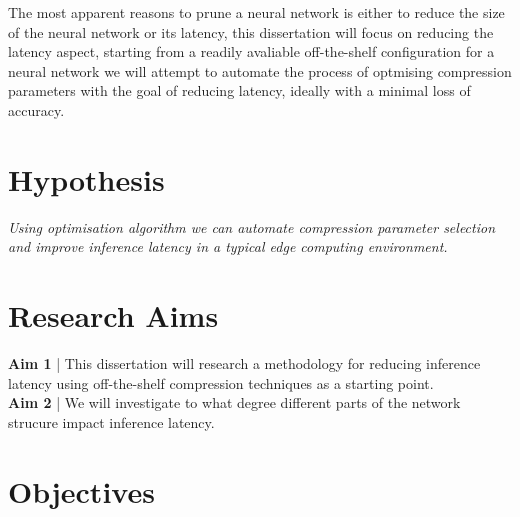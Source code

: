 \documentclass[../Dissertation.tex]{subfiles}
\begin{document}
The most apparent reasons to prune a neural network is either to reduce the size of the neural network or its latency, this dissertation will focus on reducing the latency aspect, starting from a readily avaliable off-the-shelf configuration for a neural network we will attempt to automate the process of optmising compression parameters with the goal of reducing latency, ideally with a minimal loss of accuracy.

\section{Hypothesis}
\emph{Using optimisation algorithm we can automate compression parameter selection and improve inference latency in a typical edge computing environment.}

\section{Research Aims}

\textbf{Aim 1}\label{Aim1} | This dissertation will research a methodology for reducing inference latency using off-the-shelf compression techniques as a starting point.\\
\noindent\textbf{Aim 2}\label{Aim2} | We will investigate to what degree different parts of the network strucure impact inference latency. 

\section{Objectives}
\end{document}

